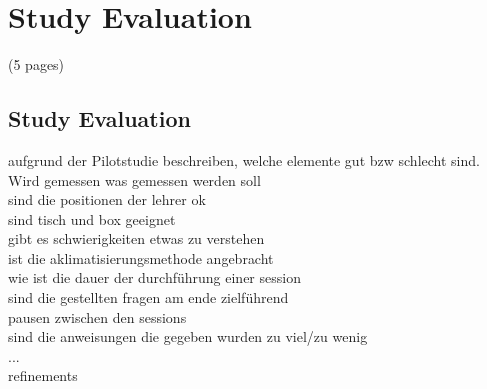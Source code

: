 \chapter{Study Evaluation}
\label{chapter:study_evaluation}
(5 pages)
\section{Study Evaluation}
aufgrund der Pilotstudie beschreiben, welche elemente gut bzw schlecht sind.\\
Wird gemessen was gemessen werden soll\\
sind die positionen der lehrer ok\\
sind tisch und box geeignet\\
gibt es schwierigkeiten etwas zu verstehen\\
ist die aklimatisierungsmethode angebracht\\
wie ist die dauer der durchführung einer session\\
sind die gestellten fragen am ende zielführend\\
pausen zwischen den sessions\\
sind die anweisungen die gegeben wurden zu viel/zu wenig\\
...\\
refinements\\